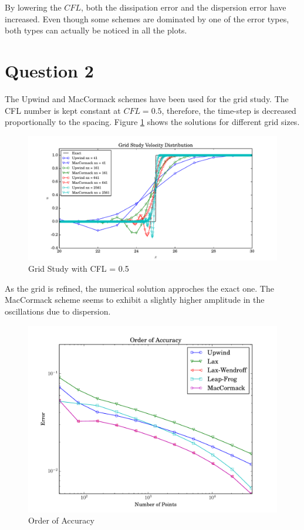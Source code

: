 \documentclass[letterpaper,12pt,]{article}
\begin{document}
By lowering the $CFL$, both the dissipation error and the dispersion error have increased.
Even though some schemes are dominated by one of the error types, both types can actually be noticed in all the plots.


\section*{Question 2}

The Upwind and MacCormack schemes have been used for the grid study.
The CFL number is kept constant at $CFL = 0.5$, therefore, the time-step is decreased proportionally to the spacing.
Figure \ref{fig:q2} shows the solutions for different grid sizes.

\begin{figure}[h]
    \centering
    \includegraphics[width = \textwidth]{./Figures/q2}
    \caption{Grid Study with CFL = 0.5}
    \label{fig:q2}
\end{figure}

As the grid is refined, the numerical solution approches the exact one. The MacCormack scheme seems to exhibit a slightly higher amplitude in the oscillations due to dispersion.

\begin{figure}[h]
    \centering
    \includegraphics[width = \textwidth]{./Figures/q3}
    \caption{Order of Accuracy}
    \label{fig:q3}
\end{figure}
\end{document}
